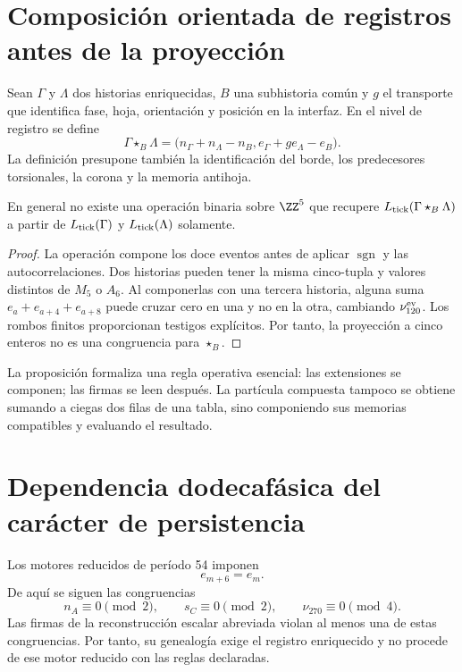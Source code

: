\section{Composición orientada de registros antes de la proyección}

Sean \(\Gamma\) y \(\Lambda\) dos historias enriquecidas, \(B\) una
subhistoria común y \(g\) el transporte que identifica fase, hoja,
orientación y posición en la interfaz. En el nivel de registro se define
\[
 \boxed{
 \Gamma\star_B\Lambda
 =\bigl(n_\Gamma+n_\Lambda-n_B,
        e_\Gamma+g e_\Lambda-e_B\bigr).}
\]
La definición presupone también la identificación del borde, los
predecesores torsionales, la corona y la memoria antihoja.

\begin{proposition}
\label{prop:no-descenso-empalme-cinco}
En general no existe una operación binaria sobre \(\ZZ^5\) que recupere
\(L_{\rm tick}(\Gamma\star_B\Lambda)\) a partir de
\(L_{\rm tick}(\Gamma)\) y \(L_{\rm tick}(\Lambda)\) solamente.
\end{proposition}

\begin{proof}
La operación compone los doce eventos antes de aplicar
\(\operatorname{sgn}\) y las autocorrelaciones. Dos historias pueden tener
la misma cinco-tupla y valores distintos de \(M_5\) o \(A_6\). Al componerlas
con una tercera historia, alguna suma
\(e_a+e_{a+4}+e_{a+8}\) puede cruzar cero en una y no en la otra, cambiando
\(\nu_{120}^{\rm ev}\). Los rombos finitos proporcionan testigos explícitos.
Por tanto, la proyección a cinco enteros no
es una congruencia para \(\star_B\).
\end{proof}

La proposición formaliza una regla operativa esencial: las extensiones se
componen; las firmas se leen después. La partícula compuesta tampoco se
obtiene sumando a ciegas dos filas de una tabla, sino componiendo sus memorias
compatibles y evaluando el resultado.

\section{Dependencia dodecafásica del carácter de persistencia}

Los motores reducidos de período 54 imponen
\[
 e_{m+6}=e_m.
\]
De aquí se siguen las congruencias
\[
 n_A\equiv0\pmod2,
 \qquad
 s_C\equiv0\pmod2,
 \qquad
 \nu_{270}\equiv0\pmod4.
\]
Las firmas de la reconstrucción escalar abreviada violan al menos una de
estas congruencias. Por tanto, su genealogía exige el registro enriquecido y
no procede de ese motor reducido con las reglas declaradas.

